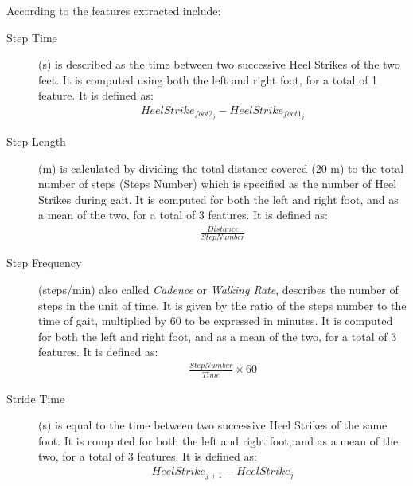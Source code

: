 According to \cite{TheSmartInsoleDataset} the features extracted include:
\begin{description}

\item[Step Time]
 (s) is described as the time between two successive Heel Strikes of the two feet. It is computed using both the left and right foot, for a total of 1 feature. It is defined as:
\begin{equation}
\begin{aligned}
HeelStrike_{foot2_j} - HeelStrike_{foot1_j}
\end{aligned}
\end{equation}

\item[Step Length] 
 (m) is calculated by dividing the total distance covered (20 m) to the total number of steps (Steps Number) which is specified as the number of Heel Strikes during gait. It is computed for both the left and right foot, and as a mean of the two, for a total of 3 features. It is defined as:
\begin{equation}
\begin{aligned}
\frac{Distance}{StepNumber}
\end{aligned}
\end{equation}


\item[Step Frequency] 
 (steps/min) also called \textit{Cadence} or \textit{Walking Rate}, describes the number of steps in the unit of time. It is given by the ratio of the steps number to the time of gait, multiplied by 60 to be expressed in minutes. It is computed for both the left and right foot, and as a mean of the two, for a total of 3 features. It is defined as:
\begin{equation}
\begin{aligned}
\frac{Step Number}{Time} \times 60
\end{aligned}
\end{equation}


\item[Stride Time] 
(s) is equal to the time between two successive Heel Strikes of the same foot. It is computed for both the left and right foot, and as a mean of the two, for a total of 3 features. It is defined as:
\begin{equation}
\begin{aligned}
HeelStrike_{j+1} - HeelStrike_{j}
\end{aligned}
\end{equation}


\end{description}
